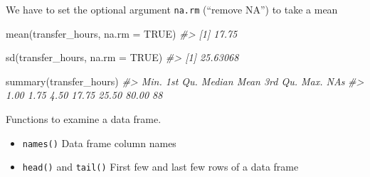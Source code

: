 \documentclass[
]{book}
\newenvironment{Shaded}{\begin{snugshade}}{\end{snugshade}}
\newcommand{\AttributeTok}[1]{\textcolor[rgb]{0.77,0.63,0.00}{#1}}
\newcommand{\CommentTok}[1]{\textcolor[rgb]{0.56,0.35,0.01}{\textit{#1}}}
\newcommand{\ConstantTok}[1]{\textcolor[rgb]{0.00,0.00,0.00}{#1}}
\newcommand{\FunctionTok}[1]{\textcolor[rgb]{0.00,0.00,0.00}{#1}}
\newcommand{\NormalTok}[1]{#1}
\providecommand{\tightlist}{%
  \setlength{\itemsep}{0pt}\setlength{\parskip}{0pt}}
\begin{document}
We have to set the optional argument \texttt{na.rm} (``remove NA'') to take a mean

\begin{Shaded}
\begin{Highlighting}[]
\FunctionTok{mean}\NormalTok{(transfer\_hours, }\AttributeTok{na.rm =} \ConstantTok{TRUE}\NormalTok{)}
\CommentTok{\#\textgreater{} [1] 17.75}

\FunctionTok{sd}\NormalTok{(transfer\_hours, }\AttributeTok{na.rm =} \ConstantTok{TRUE}\NormalTok{)}
\CommentTok{\#\textgreater{} [1] 25.63068}

\FunctionTok{summary}\NormalTok{(transfer\_hours)}
\CommentTok{\#\textgreater{}    Min. 1st Qu.  Median    Mean 3rd Qu.    Max.    NA\textquotesingle{}s }
\CommentTok{\#\textgreater{}    1.00    1.75    4.50   17.75   25.50   80.00      88}
\end{Highlighting}
\end{Shaded}

Functions to examine a data frame.

\begin{itemize}
\tightlist
\item
  \texttt{names()} Data frame column names
\item
  \texttt{head()} and \texttt{tail()} First few and last few rows of a data frame
\end{itemize}
\end{document}
